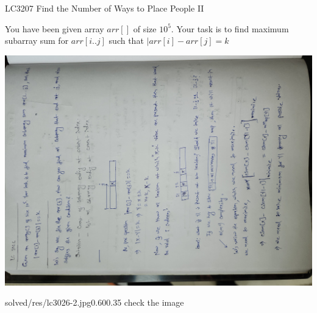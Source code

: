 \begin{problem}{LC3207 Find the Number of Ways to Place People II}

    You have been given array $arr[]$ of size $10^5$. Your task is to find maximum subarray sum for $arr[i..j]$ such that $|arr[i] - arr[j] = k$


\end{problem}

\begin{solution}[Ad-Hoc | $O(n^2)$ ]



    \includegraphics[angle = -90,width=\dimexpr\textwidth+\marginparwidth]{solved/res/lc3026-1.jpg} 


    \begin{lfigure}{solved/res/lc3026-2.jpg}{0.60}{0.35}
        check the image
    \end{lfigure}
\end{solution}
    